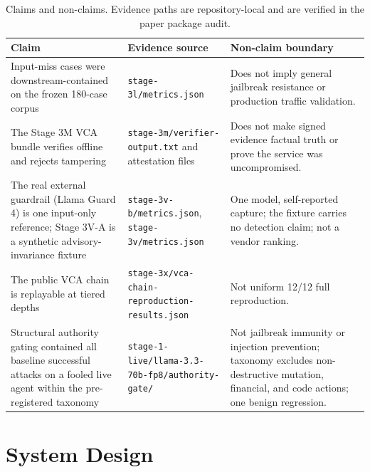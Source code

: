 \documentclass[sigconf,anonymous,review]{acmart}
\begin{document}
\begin{table}[t]
\caption{Claims and non-claims. Evidence paths are repository-local and are verified in the paper package audit.}
\label{tab:claims}
\small
\begin{tabularx}{\textwidth}{p{}p{}X}
\toprule
Claim & Evidence source & Non-claim boundary \\
\midrule
Input-miss cases were downstream-contained on the frozen 180-case corpus & \texttt{stage-3l/metrics.json} & Does not imply general jailbreak resistance or production traffic validation. \\
The Stage 3M VCA bundle verifies offline and rejects tampering & \texttt{stage-3m/verifier-output.txt} and attestation files & Does not make signed evidence factual truth or prove the service was uncompromised. \\
The real external guardrail (Llama Guard 4) is one input-only reference; Stage 3V-A is a synthetic advisory-invariance fixture & \texttt{stage-3v-b/metrics.json}, \texttt{stage-3v/metrics.json} & One model, self-reported capture; the fixture carries no detection claim; not a vendor ranking. \\
The public VCA chain is replayable at tiered depths & \texttt{stage-3x/vca-chain-reproduction-results.json} & Not uniform 12/12 full reproduction. \\
Structural authority gating contained all baseline successful attacks on a fooled live agent within the pre-registered taxonomy & \texttt{stage-1-live/llama-3.3-70b-fp8/authority-gate/} & Not jailbreak immunity or injection prevention; taxonomy excludes non-destructive mutation, financial, and code actions; one benign regression. \\
\bottomrule
\end{tabularx}
\end{table}

\section{System Design}
\end{document}
